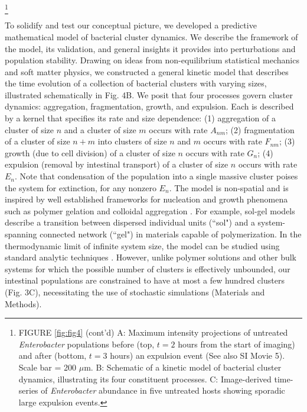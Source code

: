 {\let\thefootnote\relax\footnote{FIGURE \ref{fig:fig4} (cont'd) A: Maximum intensity projections of untreated \textit{Enterobacter} populations before (top, $t=2$ hours from the start of imaging) and after (bottom, $t=3$ hours) an expulsion event (See also SI Movie 5). Scale bar = 200 $\mu$m. B: Schematic of a kinetic model of bacterial cluster dynamics, illustrating its four constituent processes. C: Image-derived time-series of \textit{Enterobacter} abundance in five untreated hosts showing sporadic large expulsion events.}}

To solidify and test our conceptual picture, we developed a predictive mathematical model of bacterial cluster dynamics. We describe the framework of the model, its validation, and general insights it provides into perturbations and population stability. Drawing on ideas from non-equilibrium statistical mechanics and soft matter physics, we constructed a general kinetic model that describes the time evolution of a collection of bacterial clusters with varying sizes, illustrated schematically in Fig. 4B. We posit that four processes govern cluster dynamics: aggregation, fragmentation, growth, and expulsion.  Each is described by a kernel that specifies its rate and size dependence: (1) aggregation of a cluster of size $n$ and a cluster of size $m$ occurs with rate $A_{nm}$; (2) fragmentation of a cluster of size $n+m$ into clusters of size $n$ and $m$ occurs with rate $F_{nm}$; (3) growth (due to cell division) of a cluster of size $n$ occurs with rate $G_n$; (4) expulsion (removal by intestinal transport) of a cluster of size $n$ occurs with rate $E_n$. Note that condensation of the population into a single massive cluster poises the system for extinction, for any nonzero $E_n$. The model is non-spatial and is inspired by well established frameworks for nucleation and growth phenomena such as polymer gelation and colloidal aggregation \cite{krapivsky2010kinetic}. For example, sol-gel models describe a transition between dispersed individual units (``sol") and a system-spanning connected network (``gel") in materials capable of polymerization. In the thermodynamic limit of infinite system size, the model  can be studied using standard analytic techniques \cite{krapivsky2010kinetic}. However, unlike polymer solutions and other bulk systems for which the possible number of clusters is effectively unbounded, our intestinal populations are constrained to have at most a few hundred clusters (Fig. 3C), necessitating the use of stochastic simulations (Materials and Methods).

